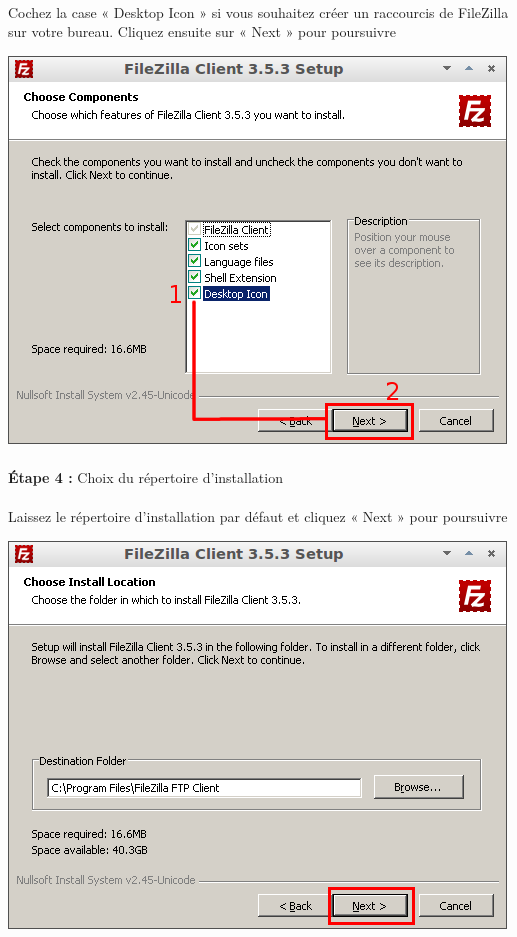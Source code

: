 \documentclass[10pt,a4paper]{article}
\begin{document}
\paragraph{}Cochez la case « Desktop Icon » si vous souhaitez créer un raccourcis de FileZilla sur votre bureau. Cliquez ensuite sur « Next » pour poursuivre
\begin{center}
\includegraphics[scale=0.5]{img/0018.png}
\end{center}
\paragraph{}\textbf{Étape 4 : }Choix du répertoire d'installation
\paragraph{}Laissez le répertoire d'installation par défaut et cliquez « Next » pour poursuivre
\begin{center}
\includegraphics[scale=0.5]{img/0019.png}
\end{center}
\end{document}
